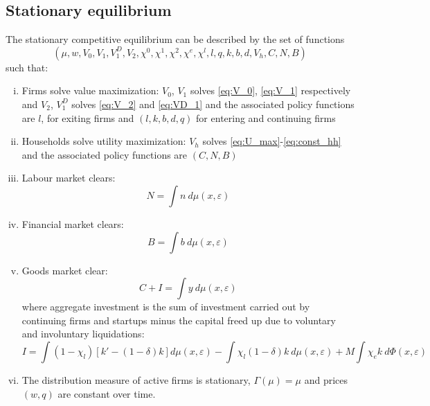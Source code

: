 \documentclass[12pt]{article}
\begin{document}
\subsection{Stationary equilibrium}\label{sec:eq}
The stationary competitive equilibrium can be described by the set of functions
$$(\mu, w, V_0, V_1, V_1^D, V_2, \chi^0, \chi^1, \chi^2,  \chi^e,  \chi^l, l,q,k,b,d, V_h, C, N, B)$$
such that: 
\begin{enumerate}[(i)]
\item Firms solve value maximization: $V_0$, $V_1$ solves \ref{eq:V_0}, \ref{eq:V_1} respectively and $V_2$, $V_1^D$ solves \ref{eq:V_2} and \ref{eq:VD_1} and the associated policy functions are $l$, for exiting firms and $(l,k,b,d,q)$ for entering and continuing firms
\item Households solve utility maximization: $V_h$ solves \ref{eq:U_max}-\ref{eq:const_hh} and the associated policy functions are $( C, N, B)$
\item Labour market clears: 
$$ N = \int n  \ d \mu (x,\varepsilon)  $$
\item Financial market clears:
 $$ B = \int b \ d \mu (x,\varepsilon) $$
\item Goods market clear: 
$$ C + I = \int y \ d \mu (x,\varepsilon)$$
where aggregate investment is the sum of investment carried out by continuing firms and startups minus the capital freed up due to voluntary and involuntary liquidations:
$$ I = \int (1-\chi_l)\left[ k' -(1-\delta)k \right] d \mu (x,\varepsilon) - \int \chi_l (1-\delta) k \ d \mu (x,\varepsilon)  + M \int \chi_e k \ d \Phi(x,\varepsilon) $$
\item The distribution measure of active firms is stationary, $\Gamma(\mu) = \mu$ and prices $(w,q)$ are constant over time.
\end{enumerate}
\end{document}
